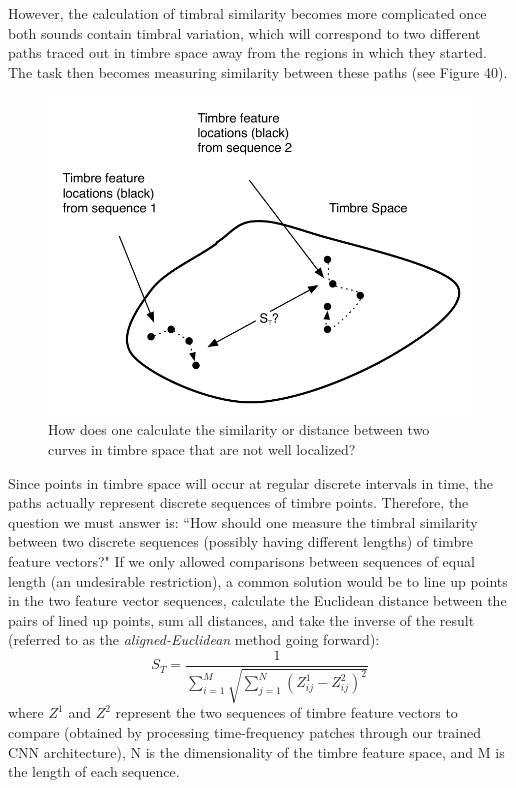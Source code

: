 \documentclass[12pt]{report} 	%
\numberwithin{figure}{chapter}
\numberwithin{table}{chapter}
\numberwithin{equation}{chapter}
\begin{document}
\begin{flushleft}
However, the calculation of timbral similarity becomes more complicated once both sounds contain timbral variation, which will correspond to two different paths traced out in timbre space away from the regions in which they started. The task then becomes measuring similarity between these paths (see Figure 40).
\begin{figure}[h!]
\begin{center}
\includegraphics[scale=0.8]{TimbreDistance2}
\caption[Timbre distance between curves]{How does one calculate the similarity or distance between two curves in timbre space that are not well localized?}
\end{center}
\end{figure}

Since points in timbre space will occur at regular discrete intervals in time, the paths actually represent discrete sequences of timbre points. Therefore, the question we must answer is: ``How should one measure the timbral similarity between two discrete sequences (possibly having different lengths) of timbre feature vectors?" If we only allowed comparisons between sequences of equal length (an undesirable restriction), a common solution would be to line up points in the two feature vector sequences, calculate the Euclidean distance between the pairs of lined up points, sum all distances, and take the inverse of the result (referred to as the \textit{aligned-Euclidean} method going forward):
\begin{equation}
S_T = \frac{1}{\sum_{i=1}^{M}\sqrt{\sum_{j=1}^{N}(Z_{ij}^1 - Z_{ij}^2)^2}}
\end{equation}
where $Z^1$ and $Z^2$ represent the two sequences of timbre feature vectors to compare (obtained by processing time-frequency patches through our trained CNN architecture), N is the dimensionality of the timbre feature space, and M is the length of each sequence.


\end{flushleft}
\end{document}
